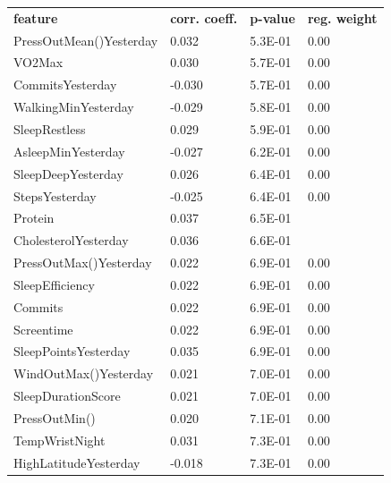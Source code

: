 \documentclass[conference]{IEEEtran}
\begin{document}
\begin{table}[]
\begin{tabular}{llll}
\textbf{feature} & \textbf{corr. coeff.} & \textbf{p-value} & \textbf{reg. weight} \\
PressOutMean()Yesterday        & 0.032  & 5.3E-01          & 0.00           \\
VO2Max                         & 0.030  & 5.7E-01          & 0.00           \\
CommitsYesterday               & -0.030 & 5.7E-01          & 0.00           \\
WalkingMinYesterday            & -0.029 & 5.8E-01          & 0.00           \\
SleepRestless                  & 0.029  & 5.9E-01          & 0.00           \\
AsleepMinYesterday             & -0.027 & 6.2E-01          & 0.00           \\
SleepDeepYesterday             & 0.026  & 6.4E-01          & 0.00           \\
StepsYesterday                 & -0.025 & 6.4E-01          & 0.00           \\
Protein                        & 0.037  & 6.5E-01          &                \\
CholesterolYesterday           & 0.036  & 6.6E-01          &                \\
PressOutMax()Yesterday         & 0.022  & 6.9E-01          & 0.00           \\
SleepEfficiency                & 0.022  & 6.9E-01          & 0.00           \\
Commits                        & 0.022  & 6.9E-01          & 0.00           \\
Screentime                     & 0.022  & 6.9E-01          & 0.00           \\
SleepPointsYesterday           & 0.035  & 6.9E-01          & 0.00           \\
WindOutMax()Yesterday          & 0.021  & 7.0E-01          & 0.00           \\
SleepDurationScore             & 0.021  & 7.0E-01          & 0.00           \\
PressOutMin()                  & 0.020  & 7.1E-01          & 0.00           \\
TempWristNight                 & 0.031  & 7.3E-01          & 0.00           \\
HighLatitudeYesterday          & -0.018 & 7.3E-01          & 0.00           \\

\end{tabular}
\end{table}
\end{document}
